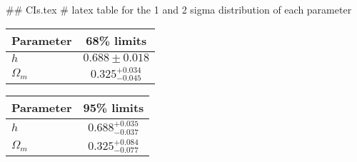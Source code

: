 ## CIs.tex
# latex table for the 1 and 2 sigma distribution of each parameter

\begin{tabular} { l  c}
 Parameter &  68\% limits\\
\hline
{\boldmath$h              $} & $0.688\pm 0.018            $\\
{\boldmath$\Omega_m       $} & $0.325^{+0.034}_{-0.045}   $\\
\hline
\end{tabular}

\begin{tabular} { l  c}
 Parameter &  95\% limits\\
\hline
{\boldmath$h              $} & $0.688^{+0.035}_{-0.037}   $\\
{\boldmath$\Omega_m       $} & $0.325^{+0.084}_{-0.077}   $\\
\hline
\end{tabular}

